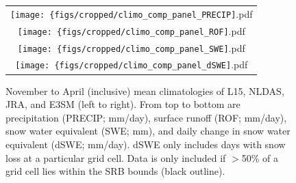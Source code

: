 \documentclass[nhess, manuscript]{copernicus}
\begin{document}
\begin{figure}
\begin{tabular}{c}
\texttt{[image: \{figs/cropped/climo\_comp\_panel\_PRECIP]}.pdf} \\
\texttt{[image: \{figs/cropped/climo\_comp\_panel\_ROF]}.pdf} \\
\texttt{[image: \{figs/cropped/climo\_comp\_panel\_SWE]}.pdf} \\
\texttt{[image: \{figs/cropped/climo\_comp\_panel\_dSWE]}.pdf}
\end{tabular}
\caption{November to April (inclusive) mean climatologies of L15, NLDAS, JRA, and E3SM (left to right). From top to bottom are precipitation (PRECIP; mm/day), surface runoff (ROF; mm/day), snow water equivalent (SWE; mm), and daily change in snow water equivalent (dSWE; mm/day). dSWE only includes days with snow loss at a particular grid cell. Data is only included if $>$50\% of a grid cell lies within the SRB bounds (black outline).}
\label{fig:means}
\end{figure}
\end{document}
